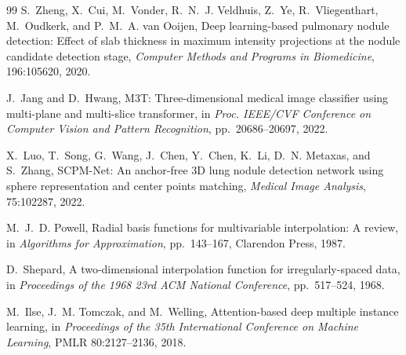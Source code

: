 \documentclass[preprint,12pt]{elsarticle}
\begin{document}
\begin{thebibliography}{99}
S.~Zheng, X.~Cui, M.~Vonder, R.~N.~J. Veldhuis, Z.~Ye, R.~Vliegenthart, M.~Oudkerk, and P.~M.~A. van Ooijen,
\newblock Deep learning-based pulmonary nodule detection: Effect of slab thickness in maximum intensity projections at the nodule candidate detection stage,
\newblock \emph{Computer Methods and Programs in Biomedicine}, 196:105620, 2020.

J.~Jang and D.~Hwang,
\newblock M3T: Three-dimensional medical image classifier using multi-plane and multi-slice transformer,
\newblock in \emph{Proc. IEEE/CVF Conference on Computer Vision and Pattern Recognition}, pp.~20686--20697, 2022.

X.~Luo, T.~Song, G.~Wang, J.~Chen, Y.~Chen, K.~Li, D.~N. Metaxas, and S.~Zhang,
\newblock SCPM-Net: An anchor-free 3D lung nodule detection network using sphere representation and center points matching,
\newblock \emph{Medical Image Analysis}, 75:102287, 2022.

M.~J.~D. Powell,
\newblock Radial basis functions for multivariable interpolation: A review,
\newblock in \emph{Algorithms for Approximation}, pp.~143--167, Clarendon Press, 1987.

D.~Shepard,
\newblock A two-dimensional interpolation function for irregularly-spaced data,
\newblock in \emph{Proceedings of the 1968 23rd ACM National Conference}, pp.~517--524, 1968.

M.~Ilse, J.~M. Tomczak, and M.~Welling,
\newblock Attention-based deep multiple instance learning,
\newblock in \emph{Proceedings of the 35th International Conference on Machine Learning}, PMLR 80:2127--2136, 2018.
\end{thebibliography}
\end{document}
